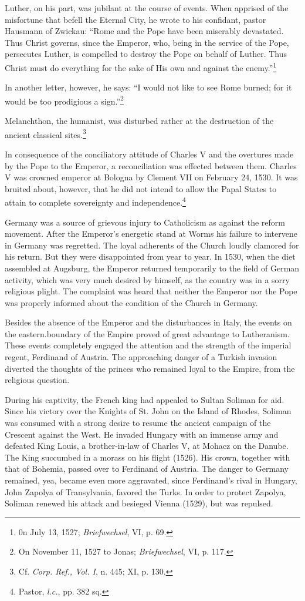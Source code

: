Luther, on his part, was jubilant at the course of events. When
apprised of the misfortune that befell the Eternal City, he wrote to
his confidant, pastor Hausmann of Zwickau: “Rome and the Pope
have been miserably devastated. Thus Christ governs, since the Emperor,
who, being in the service of the Pope, persecutes Luther, is
compelled to destroy the Pope on behalf of Luther. Thus Christ must
do everything for the sake of His own and against the enemy.”\footnote{0n July 13, 1527; \textit{Briefwechsel}, VI, p. 69.}

In another letter, however, he says: “I would not like to see Rome
burned; for it would be too prodigious a sign.”\footnote{On November 11, 1527 to Jonas; \textit{Briefwechsel}, VI, p. 117.}

Melanchthon, the
humanist, was disturbed rather at the destruction of the ancient
classical sites.\footnote{Cf. \textit{Corp. Ref., Vol. I}, n. 445; XI, p. 130.}


In consequence of the conciliatory attitude of Charles V and the
overtures made by the Pope to the Emperor, a reconciliation was effected
between them. Charles V was crowned emperor at Bologna
by Clement VII on February 24, 1530. It was bruited about, however,
that he did not intend to allow the Papal States to attain to complete
sovereignty and independence.\footnote{Pastor, \textit{l.c.}, pp. 382 sq.}

Germany was a source of grievous injury to Catholicism as against
the reform movement. After the Emperor’s energetic stand at Worms
his failure to intervene in Germany was regretted. The loyal adherents
of the Church loudly clamored for his return. But they were disappointed
from year to year. In 1530, when the diet assembled at
Augsburg, the Emperor returned temporarily to the field of German
activity, which was very much desired by himself, as the country was
in a sorry religious plight. The complaint was heard that neither the
Emperor nor the Pope was properly informed about the condition of
the Church in Germany.

Besides the absence of the Emperor and the disturbances in Italy,
the events on the eastern.boundary of the Empire proved of great advantage
to Lutheranism. These events completely engaged the attention and the
strength of the imperial regent, Ferdinand of Austria.
The approaching danger of a Turkish invasion diverted the thoughts
of the princes who remained loyal to the Empire, from the religious
question.

During his captivity, the French king had appealed to Sultan
Soliman for aid. Since his victory over the Knights of St. John on the
Island of Rhodes, Soliman was consumed with a strong desire to resume
the ancient campaign of the Crescent against the West. He invaded Hungary
with an immense army and defeated King Louis, a
brother-in-law of Charles V, at Mohacz on the Danube. The King
succumbed in a morass on his flight (1526). His crown, together
with that of Bohemia, passed over to Ferdinand of Austria. The danger
to Germany remained, yea, became even more aggravated, since
Ferdinand’s rival in Hungary, John Zapolya of Transylvania, favored
the Turks. In order to protect Zapolya, Soliman renewed his attack
and besieged Vienna (1529), but was repulsed.


